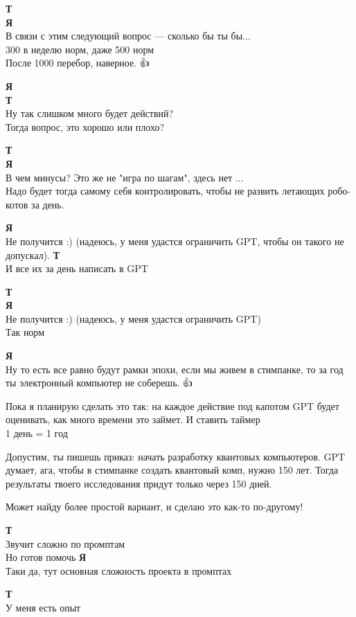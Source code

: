 \begin{tabbing}
\textbf{Т} \\
\textbf{Я} \\
В связи с этим следующий вопрос — сколько бы ты бы... \\
300 в неделю норм, даже 500 норм \\
После 1000 перебор, наверное. 👍🎅

\textbf{Я} \\
\textbf{Т} \\
Ну так слишком много будет действий? \\
Тогда вопрос, это хорошо или плохо?

\textbf{Т} \\
\textbf{Я} \\
В чем минусы? Это же не "игра по шагам", здесь нет ... \\
Надо будет тогда самому себя контролировать, чтобы не развить летающих робо-котов за день.

\textbf{Я} \\
Не получится :) (надеюсь, у меня удастся ограничить GPT, чтобы он такого не допускал).
\textbf{Т} \\
И все их за день написать в GPT

\textbf{Т} \\
\textbf{Я} \\
Не получится :) (надеюсь, у меня удастся ограничить GPT) \\
Так норм

\textbf{Я} \\
Ну то есть все равно будут рамки эпохи, если мы живем в стимпанке, то за год ты электронный компьютер не соберешь. 👍👨‍💻

Пока я планирую сделать это так: на каждое действие под капотом GPT будет оценивать, как много времени это займет. И ставить таймер \\
1 день = 1 год

Допустим, ты пишешь приказ: начать разработку квантовых компьютеров. GPT думает, ага, чтобы в стимпанке создать квантовый комп, нужно 150 лет. Тогда результаты твоего исследования придут только через 150 дней.

Может найду более простой вариант, и сделаю это как-то по-другому!

\textbf{Т} \\
Звучит сложно по промптам \\
Но готов помочь
\textbf{Я} \\
Таки да, тут основная сложность проекта в промптах

\textbf{Т} \\
У меня есть опыт


\end{tabbing}
